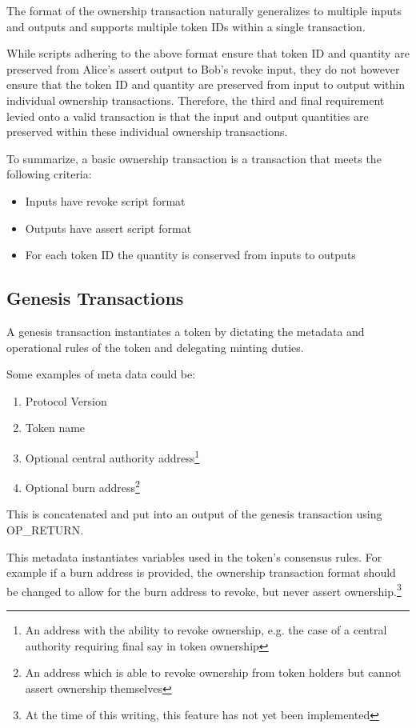 \documentclass[9pt,oneside]{amsart}
\begin{document}
The format of the ownership transaction naturally generalizes to multiple inputs and outputs and supports multiple token IDs within a single transaction.

While scripts adhering to the above format ensure that token ID and quantity are preserved from Alice's assert output to Bob's revoke input, they do not however ensure that the token ID and quantity are preserved from input to output within individual ownership transactions. Therefore, the third and final requirement levied onto a valid transaction is that the input and output quantities are preserved within these individual ownership transactions.

To summarize, a basic ownership transaction is a transaction that meets the following criteria:
\begin{itemize}
    \item Inputs have revoke script format
    \item Outputs have assert script format
    \item For each token ID the quantity is conserved from inputs to outputs
\end{itemize}

\subsection{Genesis Transactions}\label{subsec:gentrans}
A genesis transaction instantiates a token by dictating the metadata and operational rules of the token and delegating minting duties.

Some examples of meta data could be:
\begin{enumerate}
	\item Protocol Version
    \item Token name
	\item Optional central authority address\footnote{An address with the ability to revoke ownership, e.g. the case of a central authority requiring final say in token ownership}
    \item Optional burn address\footnote{An address which is able to revoke ownership from token holders but cannot assert ownership themselves}
\end{enumerate}
This is concatenated and put into an output of the genesis transaction using OP\_RETURN.

This metadata instantiates variables used in the token's consensus rules. For example if a burn address is provided, the ownership transaction format should be changed to allow for the burn address to revoke, but never assert ownership.\footnote{At the time of this writing, this feature has not yet been implemented}
\end{document}
